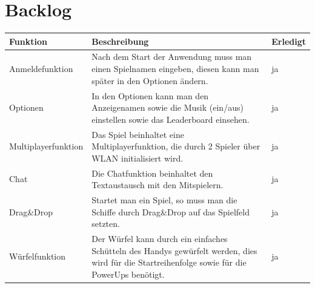 \documentclass[11pt]{article} %
\begin{document}
\section{Backlog}
\begin{table}[H]
\centering
\begin{tabular}{l|p{10cm}|l}
Funktion & Beschreibung & Erledigt \\
\hline
Anmeldefunktion     & Nach dem Start der Anwendung muss man einen Spielnamen eingeben, diesen kann man später in den Optionen ändern.                                                                                                                                                                                                                                                             & ja \\
Optionen            & In den Optionen kann man den Anzeigenamen sowie die Musik (ein/aus) einstellen sowie das Leaderboard einsehen.                                                                                                                                                                                                                                                              & ja \\
Multiplayerfunktion & Das Spiel beinhaltet eine Multiplayerfunktion, die durch 2 Spieler über WLAN initialisiert wird.                                                                                                                                                                                                                                                                          & ja \\
Chat                & Die Chatfunktion beinhaltet den Textaustausch mit den Mitspielern.                                                                                                                                                                                                                                                                                                          & ja \\
Drag\&Drop        & Startet man ein Spiel, so muss man die Schiffe durch Drag\&Drop auf das Spielfeld setzten.                                                                                                                                                                                                                                                                                & ja \\
Würfelfunktion      & Der Würfel kann durch ein einfaches Schütteln des Handys gewürfelt werden, dies wird für die Startreihenfolge sowie für die PowerUps benötigt.                                                                                                                                                                                                                             & ja \\

\end{tabular}
\end{table}
\end{document}
